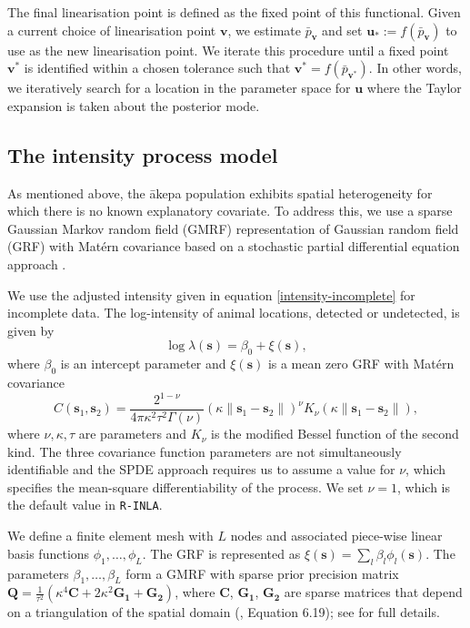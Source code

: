 \documentclass{statsoc}
\newcommand{\bs}{\mathbf{s}}
\newcommand{\bm}{\boldsymbol}  %
\newcommand{\akepa}{\textquotesingle\={a}kepa}  %
\begin{document}
The final linearisation point is defined as the fixed point of this functional.  Given a current choice of linearisation point $\bm{v}$, we estimate $\bar{p}_{\bm{v}}$ and set $\bm{u}_* :=f(\bar{p}_{\bm{v}})$ to use as the new linearisation point.  We iterate this procedure until a fixed point $\bm{v}^*$ is identified within a chosen tolerance such that $\bm{v}^* = f(\bar{p}_{\bm{v}^*})$.  In other words, we iteratively search for a location in the parameter space for $\bm{u}$ where the Taylor expansion is taken about the posterior mode.

\subsection{The intensity process model}
\label{sec-gmrf}

As mentioned above, the \akepa{} population exhibits spatial heterogeneity for which there is no known explanatory covariate.  To address this, we use a sparse Gaussian Markov random field (GMRF) representation of Gaussian random field (GRF) with Mat\'ern covariance based on a stochastic partial differential equation approach \citep{lindgren_explicit_2011}.

We use the adjusted intensity given in equation \eqref{intensity-incomplete} for incomplete data.  The log-intensity of animal locations, detected or undetected, is given by
\begin{equation*}
\log \lambda(\bs) = \beta_0 + \xi(\bs),
\end{equation*}
where $\beta_0$ is an intercept parameter and $\xi(\bs)$ is a mean zero GRF with Mat\'ern covariance
\begin{equation}
C(\bs_1,\bs_2) = \frac{2^{1-\nu}}{4\pi\kappa^2\tau^2\Gamma(\nu)}(\kappa \|\bs_1-\bs_2\|)^{\nu}K_\nu(\kappa \|\bs_1-\bs_2\|),
\end{equation}
where \(\nu, \kappa, \tau\) are parameters and \(K_{\nu}\) is the modified Bessel function of the second kind.  The three covariance function parameters are not simultaneously identifiable \citep{zhang_inconsistent_2004} and the SPDE approach requires us to assume a value for $\nu$, which specifies the mean-square differentiability of the process.  We set $\nu = 1$, which is the default value in \texttt{R-INLA}.

We define a finite element mesh with $L$ nodes and associated piece-wise linear basis functions $\phi_1, \ldots, \phi_L$. The GRF is represented as $\xi(\bs) = \sum_l \beta_l \phi_l(\bs)$.  The parameters $\beta_1, \ldots, \beta_L$ form a GMRF with sparse prior precision matrix $\bm{Q} = \frac{1}{\tau^2}\left(\kappa^4\bm{C} + 2\kappa^2\bm{G_1} + \bm{G_2}\right)$, where $\bm{C}$, $\bm{G_1}$, $\bm{G_2}$ are sparse matrices that depend on a triangulation of the spatial domain (\cite{blangiardo_spatial_2013}, Equation 6.19); see \cite{lindgren_explicit_2011} for full details.
\end{document}
